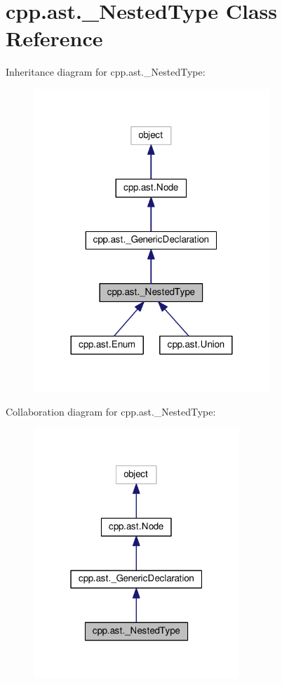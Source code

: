 \hypertarget{classcpp_1_1ast_1_1__NestedType}{}\section{cpp.\+ast.\+\_\+\+Nested\+Type Class Reference}
\label{classcpp_1_1ast_1_1__NestedType}


Inheritance diagram for cpp.\+ast.\+\_\+\+Nested\+Type\+:
\nopagebreak
\begin{figure}[H]
\begin{center}
\leavevmode
\includegraphics[width=252pt]{classcpp_1_1ast_1_1__NestedType__inherit__graph}
\end{center}
\end{figure}


Collaboration diagram for cpp.\+ast.\+\_\+\+Nested\+Type\+:
\nopagebreak
\begin{figure}[H]
\begin{center}
\leavevmode
\includegraphics[width=220pt]{classcpp_1_1ast_1_1__NestedType__coll__graph}
\end{center}
\end{figure}
